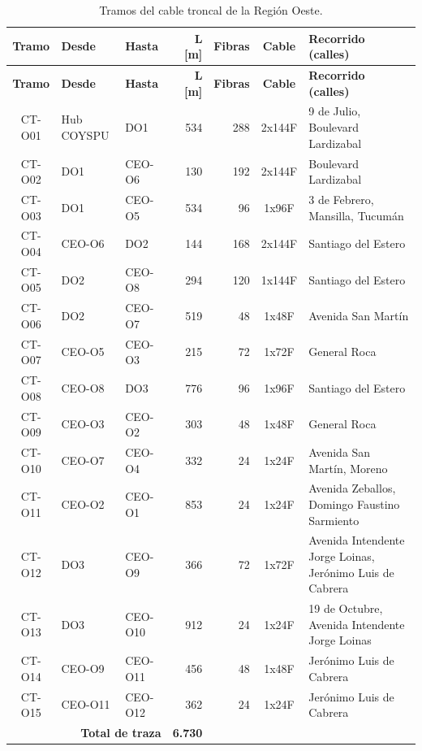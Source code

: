 \footnotesize\setlength{\tabcolsep}{4pt}\begin{longtable}{|c|l|l|r|r|c|p{4.2cm}|}
\caption{Tramos del cable troncal de la Región Oeste.}\label{tab:tramos_O}\\ \hline
\textbf{Tramo} & \textbf{Desde} & \textbf{Hasta} & \textbf{L [m]} & \textbf{Fibras} & \textbf{Cable} & \textbf{Recorrido (calles)} \\ \hline \endfirsthead
\hline \textbf{Tramo} & \textbf{Desde} & \textbf{Hasta} & \textbf{L [m]} & \textbf{Fibras} & \textbf{Cable} & \textbf{Recorrido (calles)} \\ \hline \endhead
CT-O01 & Hub COYSPU & DO1 & 534 & 288 & 2x144F & 9 de Julio, Boulevard Lardizabal \\ \hline
CT-O02 & DO1 & CEO-O6 & 130 & 192 & 2x144F & Boulevard Lardizabal \\ \hline
CT-O03 & DO1 & CEO-O5 & 534 & 96 & 1x96F & 3 de Febrero, Mansilla, Tucumán \\ \hline
CT-O04 & CEO-O6 & DO2 & 144 & 168 & 2x144F & Santiago del Estero \\ \hline
CT-O05 & DO2 & CEO-O8 & 294 & 120 & 1x144F & Santiago del Estero \\ \hline
CT-O06 & DO2 & CEO-O7 & 519 & 48 & 1x48F & Avenida San Martín \\ \hline
CT-O07 & CEO-O5 & CEO-O3 & 215 & 72 & 1x72F & General Roca \\ \hline
CT-O08 & CEO-O8 & DO3 & 776 & 96 & 1x96F & Santiago del Estero \\ \hline
CT-O09 & CEO-O3 & CEO-O2 & 303 & 48 & 1x48F & General Roca \\ \hline
CT-O10 & CEO-O7 & CEO-O4 & 332 & 24 & 1x24F & Avenida San Martín, Moreno \\ \hline
CT-O11 & CEO-O2 & CEO-O1 & 853 & 24 & 1x24F & Avenida Zeballos, Domingo Faustino Sarmiento \\ \hline
CT-O12 & DO3 & CEO-O9 & 366 & 72 & 1x72F & Avenida Intendente Jorge Loinas, Jerónimo Luis de Cabrera \\ \hline
CT-O13 & DO3 & CEO-O10 & 912 & 24 & 1x24F & 19 de Octubre, Avenida Intendente Jorge Loinas \\ \hline
CT-O14 & CEO-O9 & CEO-O11 & 456 & 48 & 1x48F & Jerónimo Luis de Cabrera \\ \hline
CT-O15 & CEO-O11 & CEO-O12 & 362 & 24 & 1x24F & Jerónimo Luis de Cabrera \\ \hline
\multicolumn{3}{|r|}{\textbf{Total de traza}} & \textbf{6.730} & \multicolumn{3}{l|}{} \\ \hline
\end{longtable}
